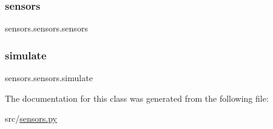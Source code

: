 \mbox{\label{classsensors_1_1sensors_a847fa1597b64dec873fb946f51092237}} 
\subsubsection{\texorpdfstring{sensors}{sensors}}
{\footnotesize\ttfamily sensors.\+sensors.\+sensors}

\mbox{\label{classsensors_1_1sensors_a8eba6f72ffd7bafc1175d34212538646}} 
\subsubsection{\texorpdfstring{simulate}{simulate}}
{\footnotesize\ttfamily sensors.\+sensors.\+simulate}



The documentation for this class was generated from the following file\+:\begin{DoxyCompactItemize}
\item 
src/\hyperlink{sensors_8py}{sensors.\+py}\end{DoxyCompactItemize}
